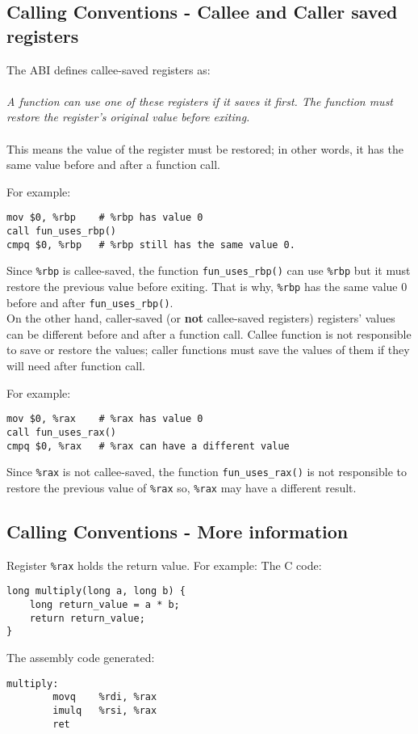 \documentclass{article}
\begin{document}
\subsection{Calling Conventions - Callee and Caller saved registers}
\label{sec: calle-caller-regs}

The ABI defines callee-saved registers as:\\
\\
\textit{A function can use one of these registers if it saves it first. The function must restore the register’s original value before exiting.} \\
\\
This means the value of the register must be restored; in other words, it has the same value before and after a function call.

\noindent For example:
\begin{verbatim}
mov $0, %rbp    # %rbp has value 0
call fun_uses_rbp()
cmpq $0, %rbp   # %rbp still has the same value 0.
\end{verbatim}

Since \texttt{\%rbp} is callee-saved, the function \texttt{fun\_uses\_rbp()} can use \texttt{\%rbp} but it must restore the previous value before exiting. That is why, \texttt{\%rbp} has the same value 0 before and after \texttt{fun\_uses\_rbp()}. \\

On the other hand, caller-saved (or \textbf{not} callee-saved registers) registers' values can be different before and after a function call. Callee function is not responsible to save or restore the values; caller functions must save the values of them if they will need after function call.

\noindent For example:
\begin{verbatim}
mov $0, %rax    # %rax has value 0
call fun_uses_rax()
cmpq $0, %rax   # %rax can have a different value 
\end{verbatim}

Since \texttt{\%rax} is not callee-saved, the function \texttt{fun\_uses\_rax()} is not responsible to restore the previous value of \texttt{\%rax} so, \texttt{\%rax} may have a different result.

\subsection{Calling Conventions - More information}
Register \texttt{\%rax} holds the return value.
\noindent For example:
\noindent The C code:
\begin{verbatim}
long multiply(long a, long b) {
    long return_value = a * b;
    return return_value;
}
\end{verbatim}
\noindent The assembly code generated:
\begin{verbatim}
multiply:
        movq    %rdi, %rax
        imulq   %rsi, %rax
        ret
\end{verbatim}
\end{document}
